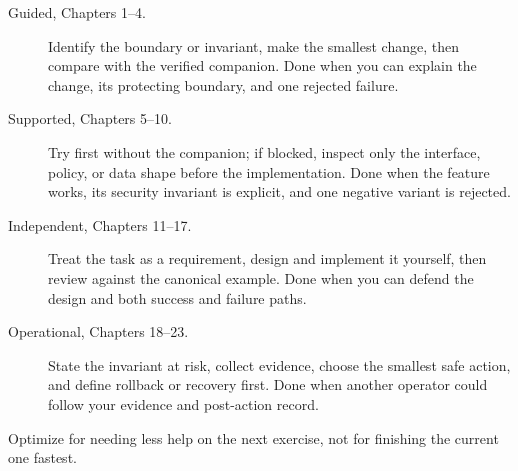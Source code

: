 \begin{description}
  \item[Guided, Chapters 1--4.] Identify the boundary or invariant, make the smallest change, then compare with the verified companion. Done when you can explain the change, its protecting boundary, and one rejected failure.
  \item[Supported, Chapters 5--10.] Try first without the companion; if blocked, inspect only the interface, policy, or data shape before the implementation. Done when the feature works, its security invariant is explicit, and one negative variant is rejected.
  \item[Independent, Chapters 11--17.] Treat the task as a requirement, design and implement it yourself, then review against the canonical example. Done when you can defend the design and both success and failure paths.
  \item[Operational, Chapters 18--23.] State the invariant at risk, collect evidence, choose the smallest safe action, and define rollback or recovery first. Done when another operator could follow your evidence and post-action record.
\end{description}

Optimize for needing less help on the next exercise, not for finishing the current one fastest.
